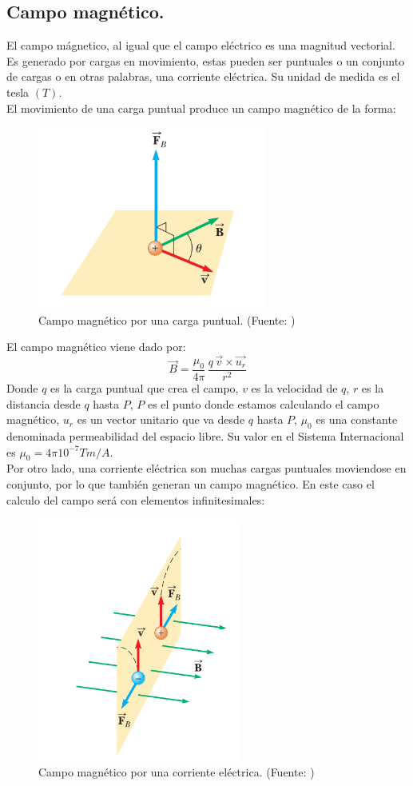 \subsection{Campo magnético.}
El campo mágnetico, al igual que el campo eléctrico es una magnitud vectorial. Es generado por cargas en movimiento, estas pueden ser puntuales o un conjunto de cargas o en otras palabras, una corriente eléctrica. Su unidad de medida es el tesla $(T)$.\\
El movimiento de una carga puntual produce un campo magnético de la forma:
\begin{figure}[H]
\centering
\includegraphics[height=6cm]{Imagenes/campomag.png}\caption{Campo magnético por una carga puntual. (Fuente: \cite{serway2015fisica})}\label{fig:Campo magnetico}
\end{figure}
El campo magnético viene dado por:
$$\overrightarrow{B}=\frac{\mu_0}{4\pi}\,\frac{q\,\overrightarrow{v}\times\overrightarrow{u_r}}{r^2}$$
Donde $q$ es la carga puntual que crea el campo, $v$ es la velocidad de $q$, $r$ es la distancia desde $q$ hasta $P$, $P$ es el punto donde estamos calculando el campo magnético, $u_r$ es un vector unitario que va desde $q$ hasta $P$, $μ_0$ es una constante denominada permeabilidad del espacio libre. Su valor en el Sistema Internacional es $μ_0 = 4 \pi 10^{-7} T m/A$.\\
Por otro lado, una corriente eléctrica son muchas cargas puntuales moviendose en conjunto, por lo que también generan un campo magnético. En este caso el calculo del campo será con elementos infinitesimales:
\begin{figure}[H]
\centering
\includegraphics[height=8cm]{Imagenes/campomag_corr.png}\caption{Campo magnético por una corriente eléctrica. (Fuente: \cite{serway2015fisica})}\label{fig:Campo magnetico por una corriente}
\end{figure}
